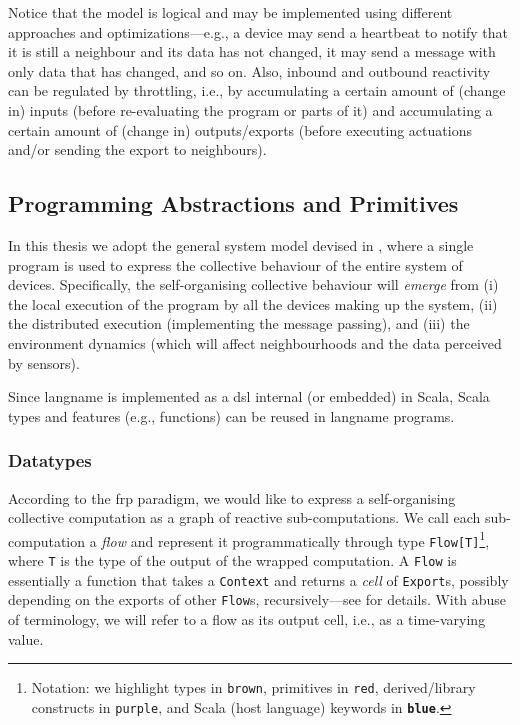 Notice that the model is logical 
 and may be implemented using different approaches and optimizations---e.g., a device may send a heartbeat to notify that it is still a neighbour and its data has not changed,
 it may send a message with only data that has changed, and so on.
%
Also, inbound and outbound reactivity can be regulated by throttling, i.e.,
 by accumulating a certain amount of (change in) inputs (before re-evaluating the program or parts of it)
 and  accumulating a certain amount of (change in) outputs/exports
 (before executing actuations and/or sending the export to neighbours).
 
%

\subsection{Programming Abstractions and Primitives}
\label{acsos2023-frp:programming-constructs}

In this thesis we adopt the general system model devised in ,
 where a single program
 is used to express the collective behaviour
 of the entire system of devices.
%
Specifically,
 the self-organising collective behaviour
 will \emph{emerge}
 from 
 (i) the local execution of the program
 by all the devices making up the system, 
 (ii) the distributed execution (implementing the message passing),
 and 
 (iii) the environment dynamics (which will affect neighbourhoods and the data perceived by sensors).

%

Since \ac{langname} is implemented as a \ac{dsl} internal (or embedded) in Scala,
 Scala types and features (e.g., functions)
 can be reused in \ac{langname} programs.

\subsubsection{Datatypes}
%
According to the \ac{frp} paradigm,
 we would like to express
 a self-organising collective computation
 as a graph of reactive sub-computations.
%
We call each sub-computation a \emph{flow}
 and represent it programmatically through type \lstinline|Flow[T]|\footnote{Notation: we highlight types in {\color{brown!50!black}\texttt{brown}}, primitives in {\color{red}\texttt{red}}, derived/library constructs in {\color{purple}\texttt{purple}}, and Scala (host language) keywords in {\color{blue}\textbf{\texttt{blue}}}.}, where \lstinline|T| is the type of the output of the wrapped computation.
%
A \lstinline|Flow| is essentially a function that takes %
a \lstinline|Context| and returns a \emph{cell} of \lstinline|Export|s, possibly depending on the exports of other \lstinline|Flow|s, recursively---see  for details.
%
With abuse of terminology,
 we will refer to a flow 
 as its output cell, i.e., as a time-varying value.

